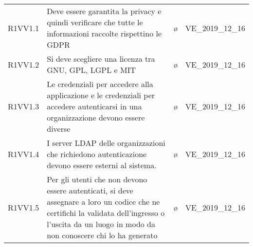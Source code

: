 {\begin{longtable}{ c C{8cm} c c}
R1VV1.1 & Deve essere garantita la privacy e quindi verificare che tutte le informazioni raccolte rispettino le GDPR & \o & VE\_2019\_12\_16 \\
R1VV1.2 & Si deve scegliere una licenza tra GNU, GPL, LGPL e MIT& \o & VE\_2019\_12\_16 \\
R1VV1.3 & Le credenziali per accedere alla applicazione e le credenziali per accedere autenticarsi in una organizzazione devono essere diverse & \o & VE\_2019\_12\_16 \\
R1VV1.4 & I server LDAP delle organizzazioni che richiedono autenticazione devono essere esterni al sistema.  & \o & VE\_2019\_12\_16 \\
R1VV1.5 & Per gli utenti che non devono essere autenticati, si deve assegnare a loro un codice che ne certifichi la validata dell’ingresso o l'uscita da un luogo in modo da non conoscere chi lo ha generato & \o & VE\_2019\_12\_16 \\
\end{longtable}
}